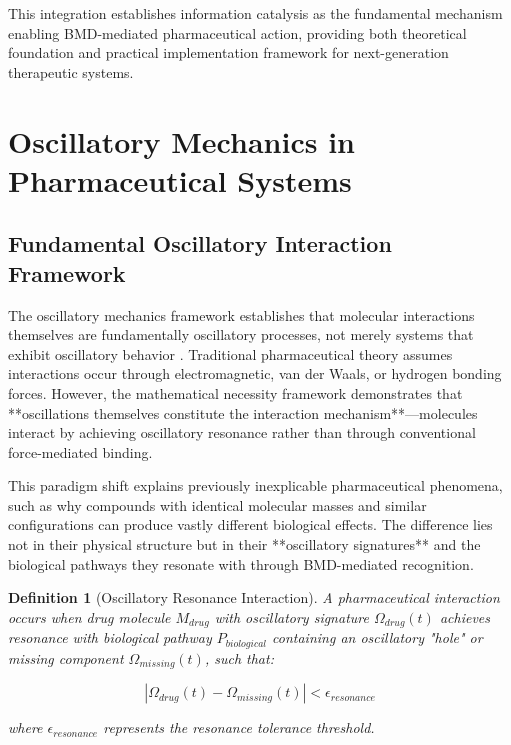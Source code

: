 \documentclass[12pt,a4paper]{article}
\newtheorem{definition}{Definition}[section]
\begin{document}
This integration establishes information catalysis as the fundamental mechanism enabling BMD-mediated pharmaceutical action, providing both theoretical foundation and practical implementation framework for next-generation therapeutic systems.

\section{Oscillatory Mechanics in Pharmaceutical Systems}

\subsection{Fundamental Oscillatory Interaction Framework}

The oscillatory mechanics framework establishes that molecular interactions themselves are fundamentally oscillatory processes, not merely systems that exhibit oscillatory behavior \citep{arnold1978mathematical, goldstein2002classical}. Traditional pharmaceutical theory assumes interactions occur through electromagnetic, van der Waals, or hydrogen bonding forces. However, the mathematical necessity framework demonstrates that **oscillations themselves constitute the interaction mechanism**—molecules interact by achieving oscillatory resonance rather than through conventional force-mediated binding.

This paradigm shift explains previously inexplicable pharmaceutical phenomena, such as why compounds with identical molecular masses and similar configurations can produce vastly different biological effects. The difference lies not in their physical structure but in their **oscillatory signatures** and the biological pathways they resonate with through BMD-mediated recognition.

\begin{definition}[Oscillatory Resonance Interaction]
A pharmaceutical interaction occurs when drug molecule $M_{drug}$ with oscillatory signature $\Omega_{drug}(t)$ achieves resonance with biological pathway $P_{biological}$ containing an oscillatory "hole" or missing component $\Omega_{missing}(t)$, such that:

\begin{equation}
|\Omega_{drug}(t) - \Omega_{missing}(t)| < \epsilon_{resonance}
\end{equation}

where $\epsilon_{resonance}$ represents the resonance tolerance threshold.
\end{definition}
\end{document}
